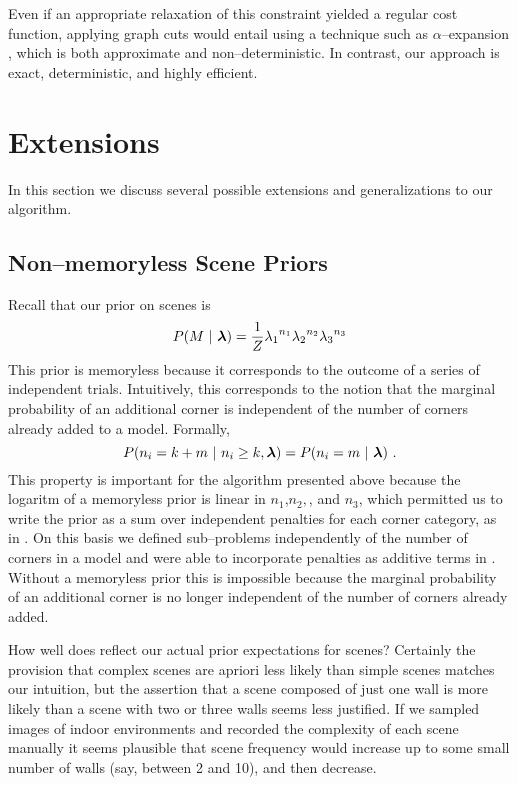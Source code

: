 Even if an appropriate relaxation of this constraint yielded a regular
cost function, applying graph cuts would entail using a technique such
as $\alpha$--expansion \cite{Kolmogorov02}, which is both approximate
and non--deterministic. In contrast, our approach is exact,
deterministic, and highly efficient.

\section{Extensions}

In this section we discuss several possible extensions and
generalizations to our algorithm.

\subsection{Non--memoryless Scene Priors}

Recall that our prior on scenes  is
\begin{equation}
  \label{eq:scene-prior-2}
  P(\Scene ~|~ \Penalties) = \frac{1}{Z} 
    {\PenaltyConc}^{n_1} {\PenaltyConv}^{n_2} {\PenaltyOccl}^{n_3}
\end{equation}
This prior is memoryless because it corresponds to the outcome of a
series of independent trials. Intuitively, this corresponds to the
notion that the marginal probability of an additional corner is
independent of the number of corners already added to a
model. Formally,
\begin{equation}
  P(n_i = k+m ~|~ n_i \geq k, \Penalties) = P(n_i = m ~|~ \Penalties) ~.
\end{equation}
This property is important for the algorithm presented above because
the logaritm of a memoryless prior is linear in $n_1$,$n_2,$, and
$n_3$, which permitted us to write the prior as a sum over independent
penalties for each corner category, as in . On
this basis we defined sub--problems independently of the number of
corners in a model and were able to incorporate penalties as additive
terms in . Without a memoryless prior this is
impossible because the marginal probability of an additional corner is
no longer independent of the number of corners already added.

How well does  reflect our actual prior
expectations for scenes? Certainly the provision that complex scenes
are apriori less likely than simple scenes matches our intuition, but
the assertion that a scene composed of just one wall is more likely
than a scene with two or three walls seems less justified. If we
sampled images of indoor environments and recorded the complexity of
each scene manually it seems plausible that scene frequency would
increase up to some small number of walls (say, between 2 and 10), and
then decrease.

